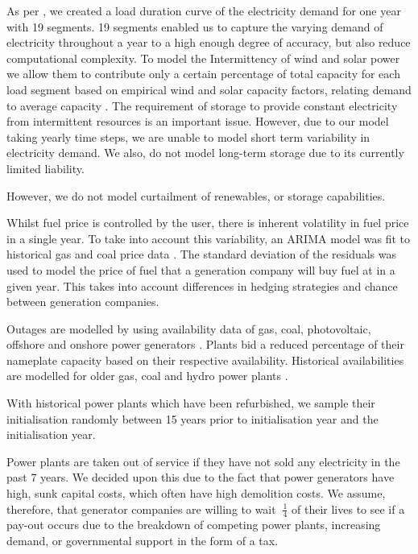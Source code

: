 As per \cite{Chappin2017}, we created a load duration curve of the electricity demand for one year with 19 segments. 19 segments enabled us to capture the varying demand of electricity throughout a year to a high enough degree of accuracy, but also reduce computational complexity. To model the Intermittency of wind and solar power we allow them to contribute only a certain percentage of total capacity for each load segment based on empirical wind and solar capacity factors, relating demand to average capacity \cite{Pfenninger2016, Staffell2016, Chappin2017}. The requirement of storage to provide constant electricity from intermittent resources is an important issue. However, due to our model taking yearly time steps, we are unable to model short term variability in electricity demand. We also, do not model long-term storage due to its currently limited liability. 

However, we do not model curtailment of renewables, or storage capabilities. 

Whilst fuel price is controlled by the user, there is inherent volatility in fuel price in a single year. To take into account this variability, an ARIMA model was fit to historical gas and coal price data \cite{coalprices,gasprices}. The standard deviation of the residuals was used to model the price of fuel that a generation company will buy fuel at in a given year. This takes into account differences in hedging strategies and chance between generation companies.

Outages are modelled by using availability data of gas, coal, photovoltaic, offshore and onshore power generators \cite{Ltd2016, Hunt2015, carroll-j}. Plants bid a reduced percentage of their nameplate capacity based on their respective availability. Historical availabilities are modelled for older gas, coal and hydro power plants \cite{AlbertaSystemElectricOperator2016}.

With historical power plants which have been refurbished, we sample their initialisation randomly between 15 years prior to initialisation year and the initialisation year.

Power plants are taken out of service if they have not sold any electricity in the past 7 years. We decided upon this due to the fact that power generators have high, sunk capital costs, which often have high demolition costs. We assume, therefore, that generator companies are willing to wait $~\frac{1}{4}$ of their lives to see if a pay-out occurs due to the breakdown of competing power plants, increasing demand, or governmental support in the form of a tax.


